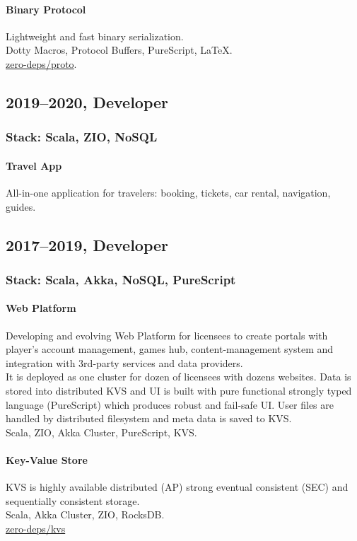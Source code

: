 \paragraph{Binary Protocol}
Lightweight and fast binary serialization.\\
Dotty Macros, Protocol Buffers, PureScript, LaTeX.\\
\href{https://github.com/zero-deps/proto}{zero-deps/proto}.

\subsection*{2019–2020, Developer}
\subsubsection*{Stack: Scala, ZIO, NoSQL}

\paragraph{Travel App}
All-in-one application for travelers: booking, tickets, car rental, navigation, guides.

\subsection*{2017–2019, Developer}
\subsubsection*{Stack: Scala, Akka, NoSQL, PureScript}

\paragraph{Web Platform}
Developing and evolving Web Platform for licensees to create portals with player's account management, games hub, content-management system and integration with 3rd-party services and data providers.\\
It is deployed as one cluster for dozen of licensees with dozens websites. Data is stored into distributed KVS and UI is built with pure functional strongly typed language (PureScript) which produces robust and fail-safe UI. User files are handled by distributed filesystem and meta data is saved to KVS.\\
Scala, ZIO, Akka Cluster, PureScript, KVS.

\paragraph{Key-Value Store}
KVS is highly available distributed (AP) strong eventual consistent (SEC) and sequentially consistent storage.\\
Scala, Akka Cluster, ZIO, RocksDB.\\
\href{https://github.com/zero-deps/kvs}{zero-deps/kvs}

